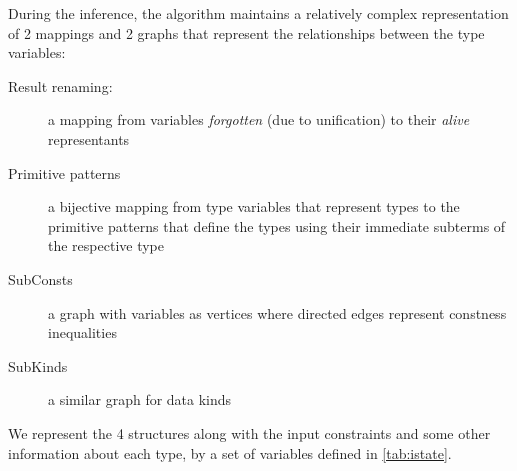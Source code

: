 During the inference, the algorithm maintains a relatively complex representation of 2 mappings and 2 graphs that represent the relationships between the type variables:

\begin{description}
    \item[Result renaming:]a mapping from variables \emph{forgotten} (due to unification) to their \emph{alive} representants
    \item[Primitive patterns] a bijective mapping from type variables that represent types to the primitive patterns that define the types using their immediate subterms of the respective type
    \item[SubConsts] a graph with variables as vertices where directed edges represent constness inequalities
    \item[SubKinds] a similar graph for data kinds
\end{description}

We represent the 4 structures along with the input constraints and some other information about each type, by a set of variables defined in \cref{tab:istate}.

